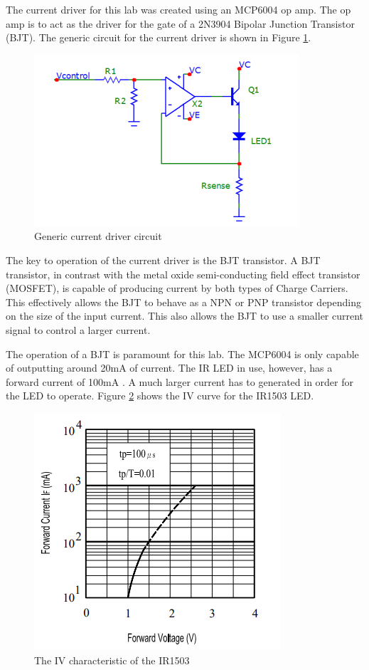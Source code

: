 
The current driver for this lab was created using an MCP6004 op amp. The op amp is to act as the driver for the gate of a 2N3904 Bipolar Junction Transistor (BJT). The generic circuit for the current driver is shown in Figure \ref{fig:currentgeneric}. 
	
	\begin{figure}[H]
		\centering
		\includegraphics[width=.6\textwidth]{CircuitDevelopment/ledgeneric.png}
		\caption{Generic current driver circuit \cite{b2}}
		\label{fig:currentgeneric}
	\end{figure}

The key to operation of the current driver is the BJT transistor. A BJT transistor, in contrast with the metal oxide semi-conducting field effect transistor (MOSFET), is capable of producing current by both types of Charge Carriers. This effectively allows the BJT to behave as a NPN or PNP transistor depending on the size of the input current. This also allows the BJT to use a smaller current signal to control a larger current. 

The operation of a BJT is paramount for this lab. The MCP6004 is only capable of outputting around 20mA of current. The IR LED in use, however, has a forward current of 100mA \cite{LEDDATA}. A much larger current has to generated in order for the LED to operate. Figure \ref{fig:ivsvled} shows the IV curve for the IR1503 LED.


\begin{figure}[H]
	\centering
	\includegraphics[width=0.7\linewidth]{CircuitDevelopment/IvsVled}
	\caption[Current vs voltage]{The IV characteristic of the IR1503 \cite{LEDDATA}}
	\label{fig:ivsvled}
\end{figure}


